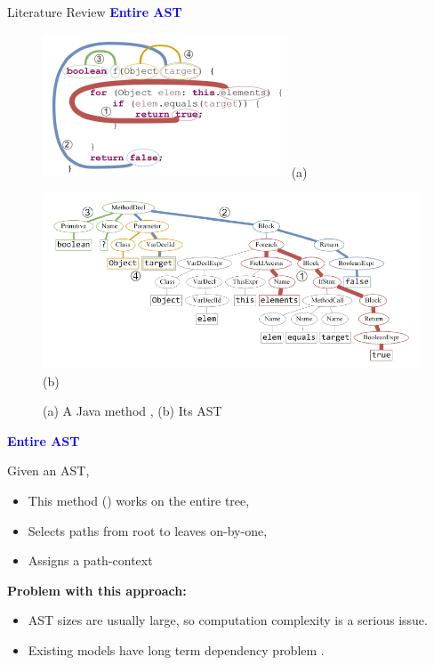 \begin{frame}[allowframebreaks]{Literature Review}
\textcolor{blue}{\textbf{Entire AST}}
\begin{figure}
\begin{center}
\begin{minipage}{0.3\textwidth}
    \centering
    \includegraphics[width=\linewidth]{images/java.png}
    (a)
\end{minipage}%
\begin{minipage}{0.6\textwidth}
    \centering
    \includegraphics[width=\linewidth]{images/ast.png}
    (b)
\end{minipage}
\caption{(a) A Java method \cite{alon2019code2vec}, (b) Its AST \cite{alon2019code2vec}}
\label{fig:entire-ast}
\end{center}
\end{figure}
\framebreak

\textcolor{blue}{\textbf{Entire AST}}
\medskip
\par Given an AST,
\begin{itemize}
    \item This method (\cite{alon2019code2vec,compton2020embedding,azcona2019user2code2vec}) works on the entire tree,
    \item Selects paths from root to leaves on-by-one,
    \item Assigns a path-context
\end{itemize}
\medskip
\par\textbf{Problem with this approach:}
\begin{itemize}
    \item AST sizes are usually large, so computation complexity is a serious issue.
    \item Existing models have long term dependency problem \cite{zhang2019novel}.
\end{itemize}
\framebreak


\end{frame}
